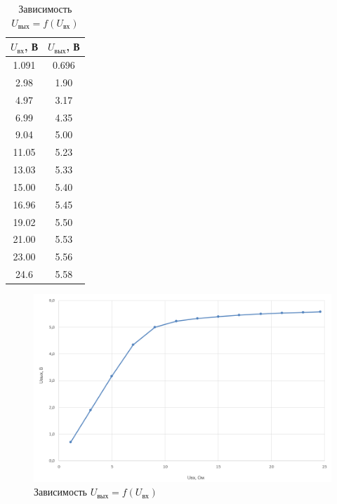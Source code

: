 \begin{table}[H]
	\begin{center}
	\caption{Зависимость $U_\text{вых} = f(U_\text{вх})$}
	\def\arraystretch{1.2}
		\begin{tabular}{|c|c|}
		\hline 
		$U_\text{вх}$, В & $U_\text{вых}$, В \\ 
		\hline 
		1.091 & 0.696 \\ 
		\hline 
		2.98 & 1.90 \\ 
		\hline 
		4.97 & 3.17 \\ 
		\hline 
		6.99 & 4.35 \\ 
		\hline %
		9.04 & 5.00 \\ 
		\hline 
		11.05 & 5.23 \\ 
		\hline 
		13.03 & 5.33 \\ 
		\hline 
		15.00 & 5.40 \\ 
		\hline 
		16.96 & 5.45 \\ 
		\hline 
		19.02 & 5.50 \\ 
		\hline 
		21.00 & 5.53 \\ 
		\hline 
		23.00 & 5.56 \\ 
		\hline 
		24.6 & 5.58 \\ 
		\hline 
		\end{tabular} 
		\label{tab:5:1}
	\end{center}
\end{table}

\begin{figure}[H]
	\begin{center}
		\includegraphics[width=14cm]{img/Uout(Uin).png}
		\caption{Зависимость $U_\text{вых} = f(U_\text{вх})$}
		\label{graphic:5:1} %
	\end{center}
\end{figure}

